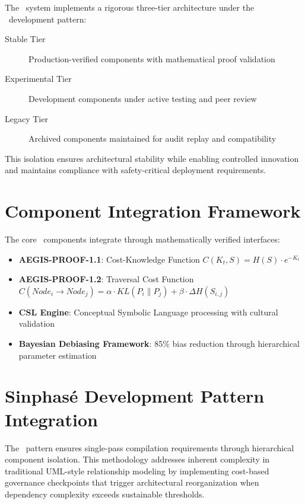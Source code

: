 \documentclass[12pt,twoside,openright]{report}
\begin{document}
The \obiai\ system implements a rigorous three-tier architecture under the \sinphase\ development pattern:

\begin{description}
\item[Stable Tier] Production-verified components with mathematical proof validation
\item[Experimental Tier] Development components under active testing and peer review  
\item[Legacy Tier] Archived components maintained for audit replay and compatibility
\end{description}

This isolation ensures architectural stability while enabling controlled innovation and maintains compliance with safety-critical deployment requirements.

\section{Component Integration Framework}

The core \obiai\ components integrate through mathematically verified interfaces:

\begin{itemize}
\item \textbf{AEGIS-PROOF-1.1}: Cost-Knowledge Function $C(K_t, S) = H(S) \cdot e^{-K_t}$
\item \textbf{AEGIS-PROOF-1.2}: Traversal Cost Function $C(Node_i \rightarrow Node_j) = \alpha \cdot KL(P_i \| P_j) + \beta \cdot \Delta H(S_{i,j})$
\item \textbf{CSL Engine}: Conceptual Symbolic Language processing with cultural validation
\item \textbf{Bayesian Debiasing Framework}: 85\% bias reduction through hierarchical parameter estimation
\end{itemize}

\section{Sinphasé Development Pattern Integration}

The \sinphase\ pattern ensures single-pass compilation requirements through hierarchical component isolation. This methodology addresses inherent complexity in traditional UML-style relationship modeling by implementing cost-based governance checkpoints that trigger architectural reorganization when dependency complexity exceeds sustainable thresholds.
\end{document}
